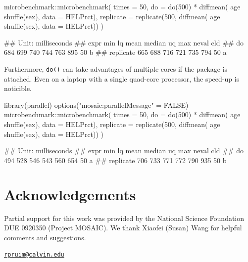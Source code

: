 \begin{Schunk}
\begin{Sinput}
microbenchmark::microbenchmark( times = 50,
  do = do(500) * diffmean( age ~ shuffle(sex), data = HELPrct),
  replicate = replicate(500, diffmean( age ~ shuffle(sex), data = HELPrct))
)
\end{Sinput}
\begin{Soutput}
## Unit: milliseconds
##       expr min  lq mean median  uq max neval cld
##         do 684 699  740    744 763 895    50   b
##  replicate 665 688  716    721 735 794    50  a
\end{Soutput}
\end{Schunk}

\noindent
Furthermore, \texttt{do()} can take advantages of multiple cores if the
 package is attached. Even on a laptop with a single
quad-core processor, the speed-up is noticible.

\begin{Schunk}
\begin{Sinput}
library(parallel)
options("mosaic:parallelMessage" = FALSE)
microbenchmark::microbenchmark( times = 50,
  do = do(500) * diffmean( age ~ shuffle(sex), data = HELPrct),
  replicate = replicate(500, diffmean( age ~ shuffle(sex), data = HELPrct))
)
\end{Sinput}
\begin{Soutput}
## Unit: milliseconds
##       expr min  lq mean median  uq max neval cld
##         do 494 528  546    543 560 654    50  a 
##  replicate 706 733  771    772 790 935    50   b
\end{Soutput}
\end{Schunk}

\section{Acknowledgements}\label{acknowledgements}

Partial support for this work was provided by the National Science
Foundation DUE 0920350 (Project MOSAIC). We thank Xiaofei (Susan) Wang
for helpful comments and suggestions.



\address{%
Randall Pruim\\
Calvin College\\
Department of Mathematics and Statistics\\ 3201 Burton St SE\\ Grand Rapids, MI 49546\\
}
\href{mailto:rpruim@calvin.edu}{\nolinkurl{rpruim@calvin.edu}}

